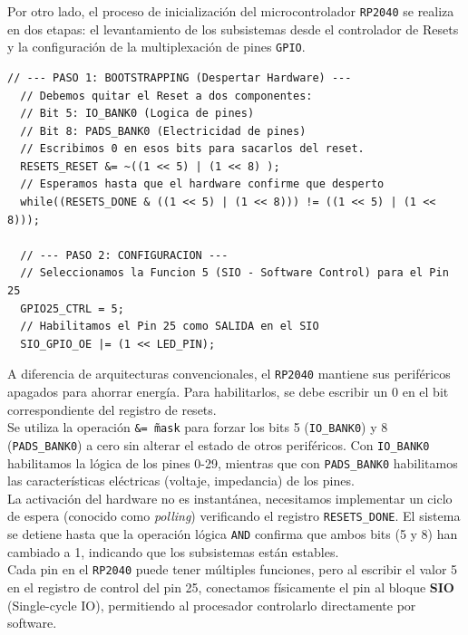 \documentclass[12pt,letterpaper]{article}
\begin{document}
\bigskip

Por otro lado, el proceso de inicialización del microcontrolador \texttt{RP2040} se realiza en dos etapas: el levantamiento de los subsistemas desde el controlador de Resets y la configuración de la multiplexación de pines \texttt{GPIO}.

\begin{lstlisting}[style=modernc, caption={Rutina de Bootstrapping y Configuración de GPIO.}]
  // --- PASO 1: BOOTSTRAPPING (Despertar Hardware) ---
  // Debemos quitar el Reset a dos componentes:
  // Bit 5: IO_BANK0 (Logica de pines)
  // Bit 8: PADS_BANK0 (Electricidad de pines)
  // Escribimos 0 en esos bits para sacarlos del reset.
  RESETS_RESET &= ~((1 << 5) | (1 << 8) );
  // Esperamos hasta que el hardware confirme que desperto
  while((RESETS_DONE & ((1 << 5) | (1 << 8))) != ((1 << 5) | (1 << 8)));
  
  // --- PASO 2: CONFIGURACION ---
  // Seleccionamos la Funcion 5 (SIO - Software Control) para el Pin 25
  GPIO25_CTRL = 5;
  // Habilitamos el Pin 25 como SALIDA en el SIO
  SIO_GPIO_OE |= (1 << LED_PIN);
\end{lstlisting}

\bigskip

A diferencia de arquitecturas convencionales, el \texttt{RP2040} mantiene sus periféricos apagados para ahorrar energía. Para habilitarlos, se debe escribir un 0 en el bit correspondiente del registro de resets.\\

\noindent
Se utiliza la operación \texttt{\&= \~mask} para forzar los bits 5 (\texttt{IO\_BANK0}) y 8 (\texttt{PADS\_BANK0}) a cero sin alterar el estado de otros periféricos. Con \texttt{IO\_BANK0} habilitamos la lógica de los pines 0-29, mientras que con \texttt{PADS\_BANK0} habilitamos las características eléctricas (voltaje, impedancia) de los pines.\\

\noindent
La activación del hardware no es instantánea, necesitamos implementar un ciclo de espera (conocido como \textit{polling}) verificando el registro \texttt{RESETS\_DONE}. El sistema se detiene hasta que la operación lógica \texttt{AND} confirma que ambos bits (5 y 8) han cambiado a 1, indicando que los subsistemas están estables.\\

\noindent
Cada pin en el \texttt{RP2040} puede tener múltiples funciones, pero al escribir el valor 5 en el registro de control del pin 25, conectamos físicamente el pin al bloque \textbf{SIO} (Single-cycle IO), permitiendo al procesador controlarlo directamente por software.\\
\end{document}
